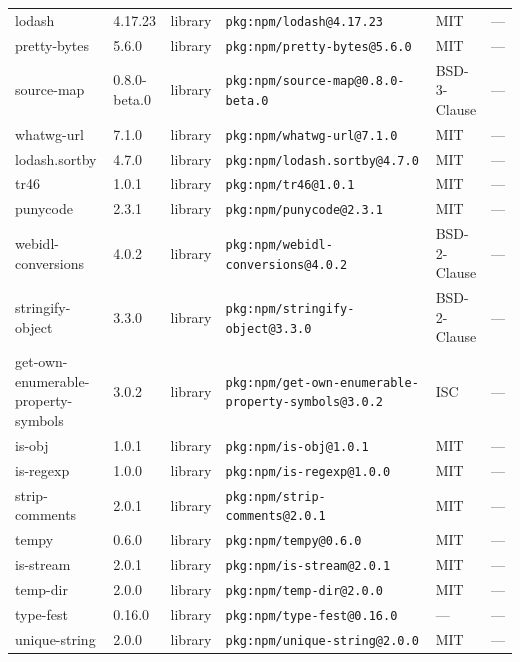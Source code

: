 \documentclass[11pt,a4paper]{article}
\begin{document}
\begin{longtable}{|p{4cm}|p{2cm}|p{1.6cm}|p{5cm}|p{1.5cm}|p{3.5cm}|}
\raggedright lodash & 4.17.23 & library & \small\texttt{pkg:npm/lodash@4.17.23} & MIT & \small — \\
\raggedright pretty-bytes & 5.6.0 & library & \small\texttt{pkg:npm/pretty-bytes@5.6.0} & MIT & \small — \\
\raggedright source-map & 0.8.0-beta.0 & library & \small\texttt{pkg:npm/source-map@0.8.0-beta.0} & BSD-3-Clause & \small — \\
\raggedright whatwg-url & 7.1.0 & library & \small\texttt{pkg:npm/whatwg-url@7.1.0} & MIT & \small — \\
\raggedright lodash.sortby & 4.7.0 & library & \small\texttt{pkg:npm/lodash.sortby@4.7.0} & MIT & \small — \\
\raggedright tr46 & 1.0.1 & library & \small\texttt{pkg:npm/tr46@1.0.1} & MIT & \small — \\
\raggedright punycode & 2.3.1 & library & \small\texttt{pkg:npm/punycode@2.3.1} & MIT & \small — \\
\raggedright webidl-conversions & 4.0.2 & library & \small\texttt{pkg:npm/webidl-conversions@4.0.2} & BSD-2-Clause & \small — \\
\raggedright stringify-object & 3.3.0 & library & \small\texttt{pkg:npm/stringify-object@3.3.0} & BSD-2-Clause & \small — \\
\raggedright get-own-enumerable-property-symbols & 3.0.2 & library & \small\texttt{pkg:npm/get-own-enumerable-property-symbols@3.0.2} & ISC & \small — \\
\raggedright is-obj & 1.0.1 & library & \small\texttt{pkg:npm/is-obj@1.0.1} & MIT & \small — \\
\raggedright is-regexp & 1.0.0 & library & \small\texttt{pkg:npm/is-regexp@1.0.0} & MIT & \small — \\
\raggedright strip-comments & 2.0.1 & library & \small\texttt{pkg:npm/strip-comments@2.0.1} & MIT & \small — \\
\raggedright tempy & 0.6.0 & library & \small\texttt{pkg:npm/tempy@0.6.0} & MIT & \small — \\
\raggedright is-stream & 2.0.1 & library & \small\texttt{pkg:npm/is-stream@2.0.1} & MIT & \small — \\
\raggedright temp-dir & 2.0.0 & library & \small\texttt{pkg:npm/temp-dir@2.0.0} & MIT & \small — \\
\raggedright type-fest & 0.16.0 & library & \small\texttt{pkg:npm/type-fest@0.16.0} & — & \small — \\
\raggedright unique-string & 2.0.0 & library & \small\texttt{pkg:npm/unique-string@2.0.0} & MIT & \small — \\

\end{longtable}
\end{document}
